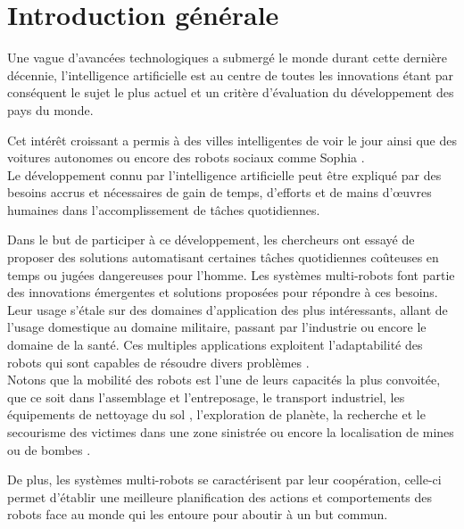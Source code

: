 
\chapter*{Introduction générale} %

\label{Introduction} %


Une vague d'avancées technologiques a submergé le monde durant cette dernière décennie, l'intelligence artificielle est au centre de toutes les innovations étant par conséquent le sujet le plus actuel et un critère d'évaluation du développement des pays du monde.


Cet intérêt croissant a permis à des villes intelligentes de voir le jour ainsi que des voitures autonomes ou encore des robots sociaux comme Sophia \cite{sofia}.\\

Le développement connu par l'intelligence artificielle peut être expliqué par des besoins accrus et nécessaires de gain de temps, d'efforts et de mains d'œuvres humaines dans l'accomplissement de tâches quotidiennes.

Dans le but de participer à ce développement, les chercheurs ont essayé de proposer des solutions automatisant certaines tâches quotidiennes coûteuses en temps ou jugées dangereuses pour l'homme.
Les systèmes multi-robots font partie des innovations émergentes et solutions proposées pour répondre à ces besoins. Leur usage s'étale sur des domaines d'application des plus intéressants, allant de l'usage domestique au domaine militaire, passant par l'industrie ou encore le domaine de la santé. Ces multiples applications exploitent l'adaptabilité des robots qui sont capables de résoudre divers problèmes \cite{uses}.\\


Notons que la mobilité des robots est l'une de leurs capacités la plus convoitée, que ce soit dans l'assemblage et l'entreposage, le transport industriel, les équipements de nettoyage du sol  \cite{novel}, l'exploration de planète, la recherche et le secourisme des victimes dans une zone sinistrée ou encore la localisation de mines ou de bombes \cite{Dadgar2016}.

De plus, les systèmes multi-robots se caractérisent par leur coopération, celle-ci permet d'établir une meilleure planification des actions et comportements des robots face au monde qui les entoure pour aboutir à un but commun. 
\\

